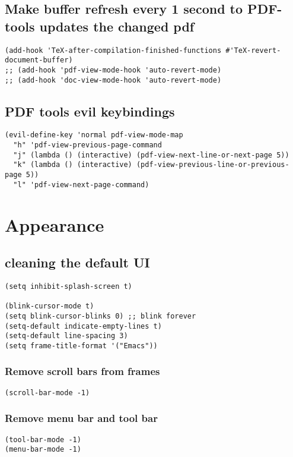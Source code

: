 \documentclass[11pt]{article}
\begin{document}
\subsection*{Make buffer refresh every 1 second to PDF-tools updates the changed pdf}
\label{sec:orga17866d}
\begin{verbatim}
(add-hook 'TeX-after-compilation-finished-functions #'TeX-revert-document-buffer)
;; (add-hook 'pdf-view-mode-hook 'auto-revert-mode)
;; (add-hook 'doc-view-mode-hook 'auto-revert-mode)
\end{verbatim}

\subsection*{PDF tools evil keybindings}
\label{sec:orgd98df24}
\begin{verbatim}
(evil-define-key 'normal pdf-view-mode-map
  "h" 'pdf-view-previous-page-command
  "j" (lambda () (interactive) (pdf-view-next-line-or-next-page 5))
  "k" (lambda () (interactive) (pdf-view-previous-line-or-previous-page 5))
  "l" 'pdf-view-next-page-command)
\end{verbatim}



\section*{Appearance}
\label{sec:orgdf0cb88}

\subsection*{cleaning the default UI}
\label{sec:orgdb747fe}

\begin{verbatim}
(setq inhibit-splash-screen t)

(blink-cursor-mode t)
(setq blink-cursor-blinks 0) ;; blink forever
(setq-default indicate-empty-lines t)
(setq-default line-spacing 3)
(setq frame-title-format '("Emacs"))
\end{verbatim}

\subsubsection*{Remove scroll bars from frames}
\label{sec:org62326bb}
\begin{verbatim}
(scroll-bar-mode -1)
\end{verbatim}

\subsubsection*{Remove menu bar and tool bar}
\label{sec:org0b6cc65}
\begin{verbatim}
(tool-bar-mode -1)
(menu-bar-mode -1)
\end{verbatim}
\end{document}
